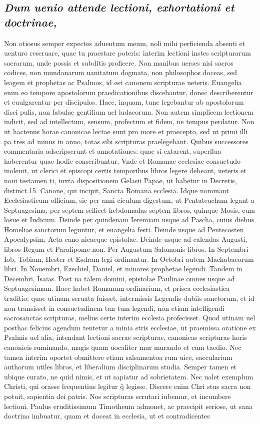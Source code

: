 \documentclass{article}
\begin{document}
\begin{pages}
\subsection*{\textit{Dum uenio attende lectioni, exhortationi et doctrinae, }}\pstart Non otiosus semper expectes aduentum meum, noli mihi perficienda absenti et uenturo reseruare, quae tu praestare poteris: interim lectioni instes scripturarum sacrarum, unde possis et subditis proficere. Non manibus uerses nisi sacros codices, non mundanarum uanitatum dogmata, non philosophos doceas, sed leagem et prophetas ac Psalmos, id est canonem scripturae ueteris. Euangelia enim eo tempore apostolorum praedicationibus discebantur, donec describerentur et euulgarentur per discipulos. Haec, inquam, tunc legebantur ab apostolorum disci pulis, non fabulae gentilium uel ludaeorum. Non autem simplicem lectionem indicit, sed ad intellectum, sensum, profectum et fidem, ne tempus perdatur. Non ut hactenus horae canonicae lectae sunt pro more et praecepto, sed ut primi illi pa tres ad minus in anno, totas sibi scripturas praelegebant. Quibus successores commentaria adscripserunt et annotationes: quae si extarent, superflua haberentur quae hodie conscribuntur. Vnde et Romanae ecclesiae consuetudo inoleuit, ut clerici et episcopi certis temporibus libros legere debeant, ueteris et noui testamen ti, iuxta dispositionem Gelasii Papae, ut habetur in Decretis, distinct.15. Canone, qui incipit, Sancta Romana ecclesia. Idque nominant Ecclesiasticum officium, sic per anni ciculum digestum, ut Pentateuchum legant a Septuagesima, per septem seilicet hebdomadas septem libros, quinque Mosis, cum losue et Iudicum. Deinde per quindenam Ieremiam usque ad Pascha, cuius diebus Homeliae sanctorum leguntur, et euangelia festi. Deinde usque ad Pentecosten Apocalypsim, Acta cano nicaeque epistolae. Deinde usque ad calendas Augusti, libros Regum et Paralipome non. Per Augustum Salomonis libros. In Septembri Iob, Tobiam, Hester et Esdram legi ordinantur. In Octobri autem Machabaeorum libri. In Nouembri, Ezechiel, Daniel, et minores prophetae legendi. Tandem in Decembri, Isaias. Post na talem domini, epistolae Paulinae omnes usque ad Septuagesimam. Haec habet Romanum ordinarium, et prisca ecclesiastica traditio: quae utinam seruata fuisset, intermissis Legendis dubiis sanctorum, et id non transisset in consuetudinem tan tum legendi, non etiam intelligendi sacrosanctas scripturas, melius certe interim ecclesia profecisset. Quod utinam uel posthac felicius agendum tentetur a minia stris ecclesiae, ut praemissa oratione ex Psalmis uel alia, intendant lectioni sacrae scripturae, canonicas scripturas horis canonicis ruminando, magis quam uocaliter mur murando et cum taedio. Nec tamen interim oportet obmittere etiam salsamentoa rum uice, saecularium authorum utiles libros, et liberalium disciplinarum studia. Semper tamen et ubique curato, ne quid nimis, et ut sapiatur ad sobrietatem. Nec ualet exemplum Christi, qui orasse frequentius legitur q̃ legisse. Discere enim Chri stus sacra non potuit, sapientia dei patris. Nos scripturas scrutari iubemur, et incumbere lectioni. Paulus eruditissimum Timotheum admonet, ac praecipit seriose, ut sana doctrina imbuatur, quam et doceat in ecclesia, ut et contradicentes 
\end{pages}
\end{document}
